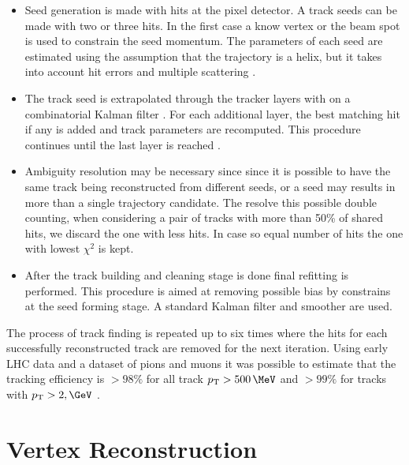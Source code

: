 \begin{itemize}
  \item Seed generation is made with hits at the pixel detector. A track seeds can be made with two or three hits. In the first case a know vertex or the beam spot is used to constrain the seed momentum. The parameters of each seed are estimated using the assumption that the trajectory is a helix, but it takes into account hit errors and multiple scattering \cite{ARTICLE:CMSTrackReconstructionSeedGeneration}.
  \item The track seed is extrapolated through the tracker layers with on a combinatorial Kalman filter \cite{ARTICLE:KalmanFilteringTrackVertexFitting} . For each additional layer, the best matching hit if any is added and track parameters are recomputed. This procedure continues until the last layer is reached \cite{ARTICLE:CMSTrackReconstruction}.
  \item Ambiguity resolution may be necessary since since it is possible to have the same track being reconstructed from different seeds, or a seed may results in more than a single trajectory candidate. The resolve this possible double counting, when considering a pair of tracks with more than 50\% of shared hits, we discard the one with less hits. In case so equal number of hits the one with lowest $\chi^2$ is kept. 
  \item After the track building and cleaning stage is done final refitting is performed. This procedure is aimed at removing possible bias by constrains at the seed forming stage. A standard Kalman filter and smoother are used.
\end{itemize}

The process of track finding is repeated up to six times where the hits for each successfully reconstructed track are removed for the next iteration. Using early \gls{LHC} data and a dataset of pions and muons it was possible to estimate that the tracking efficiency is $>98\%$ for all track $\pt > 500\,\MeV$ and $>99\%$ for tracks with $\pt > 2,\GeV$ \cite{ARTICLE:CMSMeasurmentTrackEfficiency}.

\section{Vertex Reconstruction}
\label{SECTION:EventReconstructionAndSimulation_Vertex}

